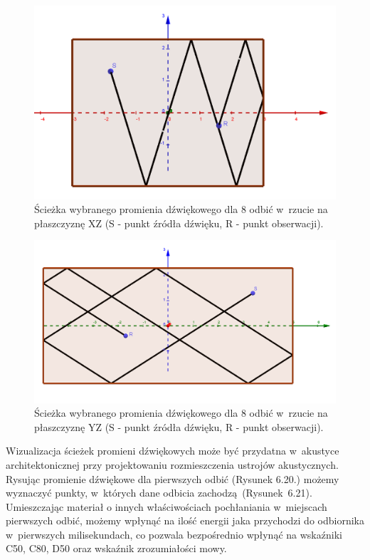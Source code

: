 \begin{figure}[H]
        \centering
                \centering
                \includegraphics[width=12cm]{odbiciay}
	\caption{Ścieżka wybranego promienia dźwiękowego dla 8 odbić w~rzucie na płaszczyznę XZ (S - punkt źródła dźwięku, R - punkt obserwacji).}
\end{figure}

\begin{figure}[H]
        \centering
                \centering
                \includegraphics[width=12cm]{odbiciax}
	\caption{Ścieżka wybranego promienia dźwiękowego dla 8 odbić w~rzucie na płaszczyznę YZ (S - punkt źródła dźwięku, R - punkt obserwacji).}
\end{figure}

Wizualizacja ścieżek promieni dźwiękowych może być przydatna w~akustyce architektonicznej przy projektowaniu rozmieszczenia ustrojów akustycznych. Rysując promienie dźwiękowe dla pierwszych odbić (Rysunek 6.20.) możemy wyznaczyć punkty, w~których dane odbicia zachodzą~(Rysunek~6.21). Umieszczając materiał o innych właściwościach pochłaniania w~miejscach pierwszych odbić, możemy wpłynąć na ilość energii jaka przychodzi do odbiornika w~pierwszych milisekundach, co pozwala bezpośrednio wpłynąć na wskaźniki C50, C80, D50 oraz wskaźnik zrozumiałości mowy.

